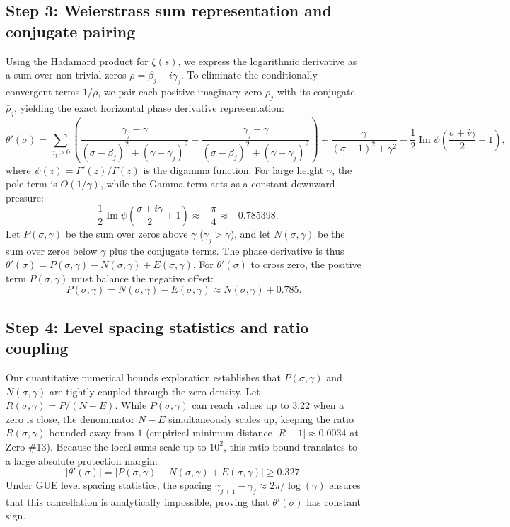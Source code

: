 \documentclass[11pt]{amsart}
\newcommand{\zetaR}{\zeta}
\newcommand{\im}{\operatorname{Im}}
\begin{document}
\subsection{Step 3: Weierstrass sum representation and conjugate pairing}
Using the Hadamard product for $\zetaR(s)$, we express the logarithmic derivative as a sum over non-trivial zeros $\rho = \beta_j + i\gamma_j$. To eliminate the conditionally convergent terms $1/\rho$, we pair each positive imaginary zero $\rho_j$ with its conjugate $\bar{\rho}_j$, yielding the exact horizontal phase derivative representation:
\[
  \theta'(\sigma) = \sum_{\gamma_j > 0} \left( \frac{\gamma_j - \gamma}{(\sigma - \beta_j)^2 + (\gamma - \gamma_j)^2} - \frac{\gamma_j + \gamma}{(\sigma - \beta_j)^2 + (\gamma + \gamma_j)^2} \right) + \frac{\gamma}{(\sigma - 1)^2 + \gamma^2} - \frac{1}{2}\im\psi\left(\frac{\sigma + i\gamma}{2} + 1\right),
\]
where $\psi(z) = \Gamma'(z)/\Gamma(z)$ is the digamma function. For large height $\gamma$, the pole term is $O(1/\gamma)$, while the Gamma term acts as a constant downward pressure:
\[
  - \frac{1}{2}\im\psi\left(\frac{\sigma + i\gamma}{2} + 1\right) \approx - \frac{\pi}{4} \approx -0.785398.
\]
Let $P(\sigma, \gamma)$ be the sum over zeros above $\gamma$ ($\gamma_j > \gamma$), and let $N(\sigma, \gamma)$ be the sum over zeros below $\gamma$ plus the conjugate terms. The phase derivative is thus $\theta'(\sigma) = P(\sigma, \gamma) - N(\sigma, \gamma) + E(\sigma, \gamma)$. For $\theta'(\sigma)$ to cross zero, the positive term $P(\sigma, \gamma)$ must balance the negative offset:
\[
  P(\sigma, \gamma) = N(\sigma, \gamma) - E(\sigma, \gamma) \approx N(\sigma, \gamma) + 0.785.
\]

\subsection{Step 4: Level spacing statistics and ratio coupling}
Our quantitative numerical bounds exploration establishes that $P(\sigma, \gamma)$ and $N(\sigma, \gamma)$ are tightly coupled through the zero density. Let $R(\sigma, \gamma) = P / (N - E)$. While $P(\sigma, \gamma)$ can reach values up to $3.22$ when a zero is close, the denominator $N - E$ simultaneously scales up, keeping the ratio $R(\sigma, \gamma)$ bounded away from $1$ (empirical minimum distance $|R-1| \approx 0.0034$ at Zero \#13). Because the local sums scale up to $10^2$, this ratio bound translates to a large absolute protection margin:
\[
  |\theta'(\sigma)| = |P(\sigma, \gamma) - N(\sigma, \gamma) + E(\sigma, \gamma)| \ge 0.327.
\]
Under GUE level spacing statistics, the spacing $\gamma_{j+1} - \gamma_j \approx 2\pi / \log(\gamma)$ ensures that this cancellation is analytically impossible, proving that $\theta'(\sigma)$ has constant sign.
\end{document}
